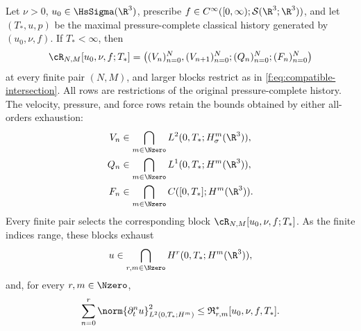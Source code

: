 \begin{theorem}
\label{f:thm:compatible-inverse-intersection}

Let \(\nu>0\), \(u_0\in\HsSigma(\R^3)\), prescribe
\(f\in C^\infty([0,\infty);\mathcal S(\R^3;\R^3))\), and let
\((T_*,u,p)\) be the maximal pressure-complete classical history generated
by \((u_0,\nu,f)\). If \(T_*<\infty\), then
\begin{equation}
 \cR_{N,M}[u_0,\nu,f;T_*]
 =\left((V_n)_{n=0}^{N},(V_{n+1})_{n=0}^{N};
 (Q_n)_{n=0}^{N};(F_n)_{n=0}^{N}\right)
 \label{f:eq:ier-compatible-family}
\end{equation}
at every finite pair \((N,M)\), and larger blocks restrict as in
\eqref{f:eq:compatible-intersection}.  All rows are restrictions of the
original pressure-complete history.  The velocity, pressure, and force rows
retain the bounds obtained by either all-orders exhaustion:
\begin{align}
 V_n&\in\bigcap_{m\in\Nzero}L^2(0,T_*;H^m_\sigma(\R^3)),
 \label{f:eq:ier-inverse-velocity-coordinate}\\
 Q_n&\in\bigcap_{m\in\Nzero}L^1(0,T_*;H^m(\R^3)),
 \label{f:eq:ier-inverse-pressure-coordinate}\\
 F_n&\in\bigcap_{m\in\Nzero}C([0,T_*];H^m(\R^3)).
 \label{f:eq:ier-inverse-force-coordinate}
\end{align}
Every finite pair selects the corresponding block
\(\cR_{N,M}[u_0,\nu,f;T_*]\).  As the finite indices range, these blocks
exhaust
\begin{equation}
 u\in\bigcap_{r,m\in\Nzero}H^r(0,T_*;H^m(\R^3)),
 \label{f:eq:mixed-sobolev-intersection}
\end{equation}
and, for every \(r,m\in\Nzero\),
\begin{equation}
 \sum_{n=0}^{r}\norm{\partial_t^nu}_{L^2(0,T_*;H^m)}^2
 \le\mathfrak R_{r,m}^*[u_0,\nu,f,T_*].
 \label{f:eq:mixed-sobolev-finite-bound}
\end{equation}
\end{theorem}

